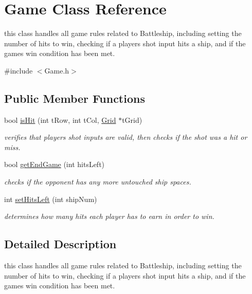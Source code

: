 \hypertarget{classGame}{}\section{Game Class Reference}
\label{classGame}


this class handles all game rules related to Battleship, including setting the number of hits to win, checking if a player\textquotesingle{}s shot input hits a ship, and if the game\textquotesingle{}s win condition has been met.  




{\ttfamily \#include $<$Game.\+h$>$}

\subsection*{Public Member Functions}
\begin{DoxyCompactItemize}
\item 
bool \hyperlink{classGame_a44dd26e02329730028443a7ff28e1513}{is\+Hit} (int t\+Row, int t\+Col, \hyperlink{classGrid}{Grid} $\ast$t\+Grid)
\begin{DoxyCompactList}\small\item\em verifies that player\textquotesingle{}s shot inputs are valid, then checks if the shot was a hit or miss. \end{DoxyCompactList}\item 
bool \hyperlink{classGame_ad71f679248bf79e4edd5b93d5985b098}{get\+End\+Game} (int hits\+Left)
\begin{DoxyCompactList}\small\item\em checks if the opponent has any more untouched ship spaces. \end{DoxyCompactList}\item 
int \hyperlink{classGame_a6342beaca9d9388cb06025e2e577d41b}{set\+Hits\+Left} (int ship\+Num)
\begin{DoxyCompactList}\small\item\em determines how many hits each player has to earn in order to win. \end{DoxyCompactList}\end{DoxyCompactItemize}


\subsection{Detailed Description}
this class handles all game rules related to Battleship, including setting the number of hits to win, checking if a player\textquotesingle{}s shot input hits a ship, and if the game\textquotesingle{}s win condition has been met. 

